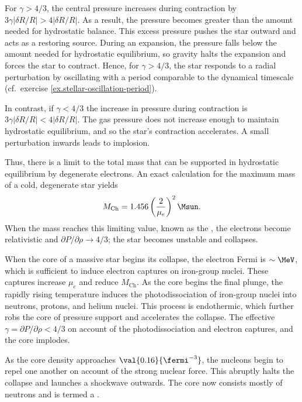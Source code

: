 \begin{sidebar}
For $\gamma > 4/3$, the central pressure increases during contraction by $3\gamma|\delta R/R| > 4|\delta R/R|$. As a result, the pressure becomes greater than the amount needed for hydrostatic balance. This excess pressure pushes the star outward and acts as a restoring source. During an expansion, the pressure falls below the amount needed for hydrostatic equilibrium, so gravity halts the expansion and forces the star to contract. Hence, for $\gamma > 4/3$, the star responds to a radial perturbation by oscillating with a period comparable to the dynamical timescale (cf.\ exercise \ref{ex.stellar-oscillation-period}).

In contrast, if $\gamma < 4/3$ the increase in pressure during contraction is $3\gamma|\delta R/R| < 4|\delta R/R|$. The gas pressure does not increase enough to maintain hydrostatic equilibrium, and so the star's contraction accelerates. A small perturbation inwards leads to implosion.
\end{sidebar}

Thus, there is a limit to the total mass that can be supported in hydrostatic equilibrium by degenerate electrons. 
An exact calculation for the maximum mass of a cold, degenerate star yields
\begin{equation}\label{e.Chandrasekhar}
	M_{\mathrm{Ch}} = 1.456 \left(\frac{2}{\mu_{e}}\right)^{2}\Msun.
\end{equation}
When the mass reaches this limiting value, known as the , the electrons become relativistic and $\partial P/\partial \rho \to 4/3$; the star becomes unstable and collapses.

When the core of a massive star begins its collapse, the electron Fermi is $\sim\MeV$, which is sufficient to induce electron captures on iron-group nuclei. These captures increase $\mu_{e}$ and reduce $M_{\mathrm{Ch}}$. As the core begins the final plunge, the rapidly rising temperature induces the photodissociation of iron-group nuclei into neutrons, protons, and helium nuclei. This process is endothermic, which further robs the core of pressure support and accelerates the collapse. The effective $\gamma = \partial P/\partial\rho < 4/3$ on account of the photodissociation and electron captures, and the core implodes.

As the core density approaches $\val{0.16}{\fermi^{-3}}$, the nucleons begin to repel one another on account of the strong nuclear force. This abruptly halts the collapse and launches a shockwave outwards. The core now consists mostly of neutrons and is termed a .

